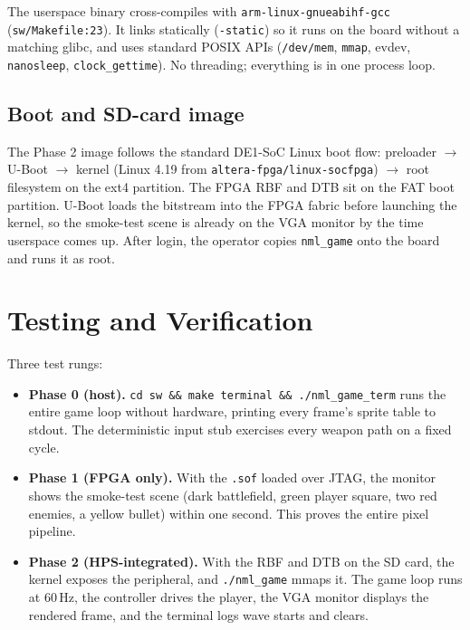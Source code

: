 \documentclass[11pt,letterpaper]{article}
\begin{document}
The userspace binary cross-compiles with \texttt{arm-linux-gnueabihf-gcc}
(\texttt{sw/Makefile:23}). It links statically (\texttt{-static}) so it runs
on the board without a matching glibc, and uses standard POSIX APIs
(\texttt{/dev/mem}, \texttt{mmap}, evdev, \texttt{nanosleep},
\texttt{clock\_gettime}). No threading; everything is in one process loop.

\subsection{Boot and SD-card image}

The Phase 2 image follows the standard DE1-SoC Linux boot flow: preloader
$\to$ U-Boot $\to$ kernel (Linux 4.19 from \texttt{altera-fpga/linux-socfpga})
$\to$ root filesystem on the ext4 partition. The FPGA RBF and DTB sit on the
FAT boot partition. U-Boot loads the bitstream into the FPGA fabric before
launching the kernel, so the smoke-test scene is already on the VGA monitor
by the time userspace comes up. After login, the operator copies
\texttt{nml\_game} onto the board and runs it as root.

\section{Testing and Verification}

Three test rungs:

\begin{itemize}[leftmargin=*]
  \item \textbf{Phase 0 (host).} \texttt{cd sw \&\& make terminal \&\&
    ./nml\_game\_term} runs the entire game loop without hardware, printing
    every frame's sprite table to stdout. The deterministic input stub
    exercises every weapon path on a fixed cycle.
  \item \textbf{Phase 1 (FPGA only).} With the \texttt{.sof} loaded over JTAG,
    the monitor shows the smoke-test scene (dark battlefield, green player
    square, two red enemies, a yellow bullet) within one second. This proves
    the entire pixel pipeline.
  \item \textbf{Phase 2 (HPS-integrated).} With the RBF and DTB on the SD
    card, the kernel exposes the peripheral, and \texttt{./nml\_game} mmaps
    it. The game loop runs at 60\,Hz, the controller drives the player, the
    VGA monitor displays the rendered frame, and the terminal logs wave
    starts and clears.
\end{itemize}
\end{document}

